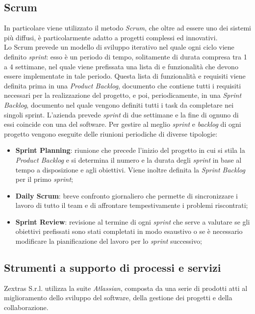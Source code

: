 \subsection{Scrum}
In particolare  viene utilizzato il metodo \emph{Scrum}, che oltre ad essere uno dei sistemi più diffusi, è particolarmente adatto a progetti complessi ed innovativi.\\
Lo Scrum prevede un modello di sviluppo iterativo nel quale ogni ciclo viene definito \emph{sprint}: esso è un periodo di tempo, solitamente di durata compresa tra 1 a 4 settimane, nel quale viene prefissata una lista di  e funzionalità che devono essere implementate in tale periodo.
Questa lista di funzionalità e requisiti viene definita prima in una \emph{Product Backlog}, documento che contiene tutti i requisiti necessari per la realizzazione del progetto, e poi, periodicamente, in una \emph{Sprint Backlog}, documento nel quale vengono definiti tutti i task da completare nei singoli sprint.
L'azienda prevede \emph{sprint} di due settimane e la fine di ognuno di essi coincide con una  del software.
Per gestire al meglio \emph{sprint} e \emph{backlog} di ogni progetto vengono eseguite delle riunioni periodiche di diverse tipologie:
\begin{itemize}
	\item \textbf{Sprint Planning}: riunione che precede l'inizio del progetto in cui si stila la \emph{Product Backlog} e si determina il numero e la durata degli \emph{sprint} in base al tempo a disposizione e agli obiettivi. Viene inoltre definita la \emph{Sprint Backlog} per il primo \emph{sprint};
	\item \textbf{Daily Scrum}: breve confronto giornaliero che permette di sincronizzare i lavoro di tutto il team e di affrontare tempestivamente i problemi riscontrati;
	\item \textbf{Sprint Review}: revisione al termine di ogni \emph{sprint} che serve a valutare se gli obiettivi prefissati sono stati completati in modo esaustivo o se è necessario modificare la pianificazione del lavoro per lo \emph{sprint} successivo;
\end{itemize}

\subsection{Strumenti a supporto di processi e servizi}
Zextras S.r.l. utilizza la suite \emph{Atlassian}, composta da una serie di prodotti atti al miglioramento dello sviluppo del software, della gestione dei progetti e della collaborazione. 

